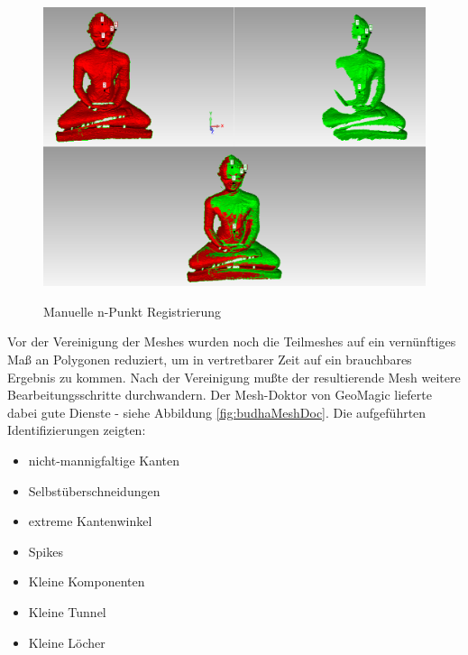 \documentclass[]{article}
\begin{document}
\begin{figure}[H]
\caption{Manuelle n-Punkt Registrierung}
\centering
\includegraphics[scale=0.35]{images/GeoMagicBudhaPictures/Budha_Scans_Aufrecht_manualRegistration_03.PNG}
\label{fig:budhaManual}
\end{figure}
 
Vor der Vereinigung der Meshes wurden noch die Teilmeshes auf ein vernünftiges Maß an Polygonen reduziert, um in vertretbarer Zeit auf ein brauchbares Ergebnis zu kommen.
Nach der Vereinigung mußte der resultierende Mesh weitere Bearbeitungsschritte durchwandern. Der Mesh-Doktor von GeoMagic lieferte dabei gute Dienste - siehe Abbildung \ref{fig:budhaMeshDoc}. Die aufgeführten Identifizierungen zeigten:

\begin{itemize}
\item nicht-mannigfaltige Kanten
\item Selbstüberschneidungen
\item extreme Kantenwinkel
\item Spikes
\item Kleine Komponenten
\item Kleine Tunnel
\item Kleine Löcher
\end{itemize}
\end{document}
